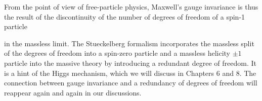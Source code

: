 
From the point of view of free-particle physics, Maxwell’s gauge invariance is thus
the result of the discontinuity of the number of degrees of freedom of a spin-1 particle

in the massless limit. The Stueckelberg formalism incorporates the massless split of the
degrees of freedom into a spin-zero particle and a massless helicity $\pm1$ particle into
the massive theory by introducing a redundant degree of freedom. It is a hint of the Higgs
mechanism, which we will discuss in Chapters 6 and 8. The connection between gauge
invariance and a redundancy of degrees of freedom will reappear again and again in
our discussions.
